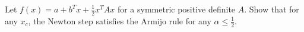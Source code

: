 \documentclass[11pt]{article}
\begin{document}
Let $f(x)=a + b^Tx + \frac{1}{2}x^TAx$ for a symmetric positive definite $A$. Show that for any $x_c$, the Newton step satisfies the Armijo rule for any $\alpha\le \frac{1}{2}$. 
\end{document}

